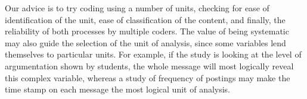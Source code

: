 \documentclass{book}
\begin{document}
Our advice is to try coding using a number of units, checking for ease of identification of the unit, ease of classification of the content, and finally, the reliability of both processes by multiple coders. The value of being systematic may also guide the selection of the unit of analysis, since some variables lend themselves to particular units. For example, if the study is looking at the level of argumentation shown by students, the whole message will most logically reveal this complex variable, whereas a study of frequency of postings may make the time stamp on each message the most logical unit of analysis.
\end{document}
